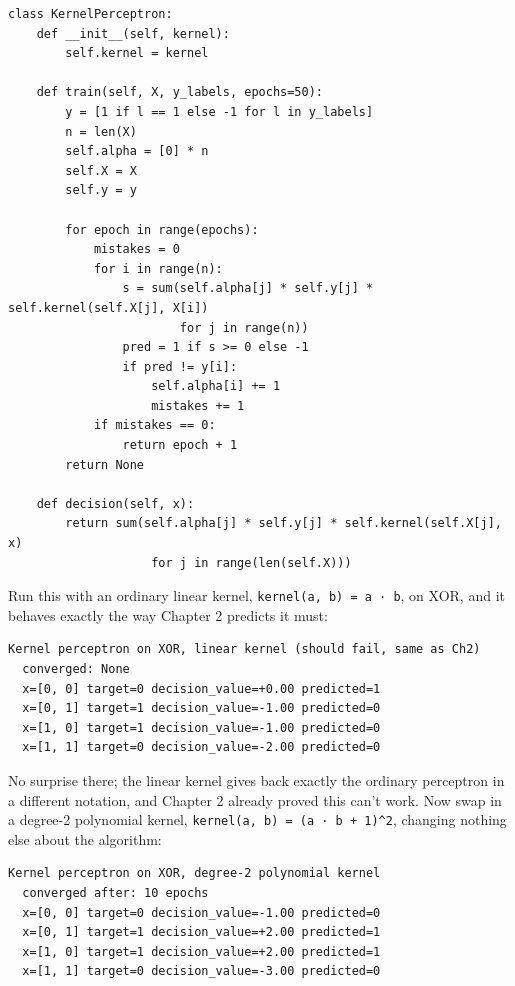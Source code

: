 \begin{Verbatim}[fontsize=\small, frame=single, xleftmargin=1em, xrightmargin=1em]
class KernelPerceptron:
    def __init__(self, kernel):
        self.kernel = kernel

    def train(self, X, y_labels, epochs=50):
        y = [1 if l == 1 else -1 for l in y_labels]
        n = len(X)
        self.alpha = [0] * n
        self.X = X
        self.y = y

        for epoch in range(epochs):
            mistakes = 0
            for i in range(n):
                s = sum(self.alpha[j] * self.y[j] * self.kernel(self.X[j], X[i])
                        for j in range(n))
                pred = 1 if s >= 0 else -1
                if pred != y[i]:
                    self.alpha[i] += 1
                    mistakes += 1
            if mistakes == 0:
                return epoch + 1
        return None

    def decision(self, x):
        return sum(self.alpha[j] * self.y[j] * self.kernel(self.X[j], x)
                    for j in range(len(self.X)))
\end{Verbatim}

Run this with an ordinary linear kernel, \texttt{kernel(a, b) = a · b}, on XOR, and it behaves exactly the way Chapter 2 predicts it must:

\begin{Verbatim}[fontsize=\small, frame=single, xleftmargin=1em, xrightmargin=1em]
Kernel perceptron on XOR, linear kernel (should fail, same as Ch2)
  converged: None
  x=[0, 0] target=0 decision_value=+0.00 predicted=1
  x=[0, 1] target=1 decision_value=-1.00 predicted=0
  x=[1, 0] target=1 decision_value=-1.00 predicted=0
  x=[1, 1] target=0 decision_value=-2.00 predicted=0
\end{Verbatim}

No surprise there; the linear kernel gives back exactly the ordinary perceptron in a different notation, and Chapter 2 already proved this can't work. Now swap in a degree-2 polynomial kernel, \texttt{kernel(a, b) = (a · b + 1)\textasciicircum{}2}, changing nothing else about the algorithm:

\begin{Verbatim}[fontsize=\small, frame=single, xleftmargin=1em, xrightmargin=1em]
Kernel perceptron on XOR, degree-2 polynomial kernel
  converged after: 10 epochs
  x=[0, 0] target=0 decision_value=-1.00 predicted=0
  x=[0, 1] target=1 decision_value=+2.00 predicted=1
  x=[1, 0] target=1 decision_value=+2.00 predicted=1
  x=[1, 1] target=0 decision_value=-3.00 predicted=0
\end{Verbatim}

